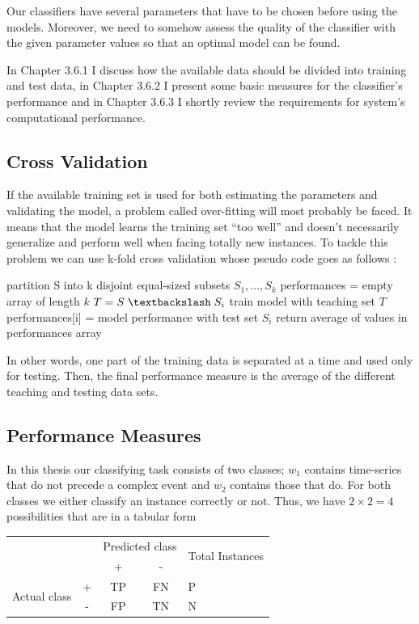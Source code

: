 Our classifiers have several parameters that have to be chosen before using the models. Moreover, we need to somehow assess the quality of the classifier with the given parameter values so that an optimal model can be found. 

In Chapter 3.6.1 I discuss how the available data should be divided into training and test data, in Chapter 3.6.2 I present some basic measures for the classifier's performance and in Chapter 3.6.3 I shortly review the requirements for system's computational performance.


\subsection{Cross Validation}
If the available training set is used for both estimating the parameters and validating the model, a problem called over-fitting will most probably be faced. It means that the model learns the training set ``too well'' and doesn't necessarily generalize and perform well when facing totally new instances. To tackle this problem we can use k-fold cross validation whose pseudo code goes as follows \cite{Elkan12}:

\begin{algorithm}[H]
	partition S into k disjoint equal-sized subsets $S_1, ..., S_k$\;
	performances = empty array of length $k$\;
	 {
		$T = S \; \textbackslash \; S_i$\;
		train model with teaching set $T$\;
		performances[i] = model performance with test set $S_i$\;
	}
	return average of values in performances array\;
\end{algorithm}

In other words, one part of the training data is separated at a time and used only for testing. Then, the final performance measure is the average of the different teaching and testing data sets.

\subsection{Performance Measures}
In this thesis our classifying task consists of two classes; $w_1$ contains time-series that do not precede a complex event and $w_2$ contains those that do. For both classes we either classify an instance correctly or not. Thus, we have $2 \times 2 = 4$ possibilities that are in a tabular form

\begin{center}
  \label{table:performance}
  \begin{tabular}{r | c | c | c | l}
    \hline
   	\multicolumn{2}{c}{} & \multicolumn{2}{|c|}{Predicted class} &  \multirow{2}{*}{Total Instances} \\
    \multicolumn{2}{c|}{} & + & - & \\
	\hline
	\multirow{2}{*}{Actual class} & + & TP & FN & P \\
	& - & FP & TN & N \\
	\hline
  \end{tabular}
\end{center}

